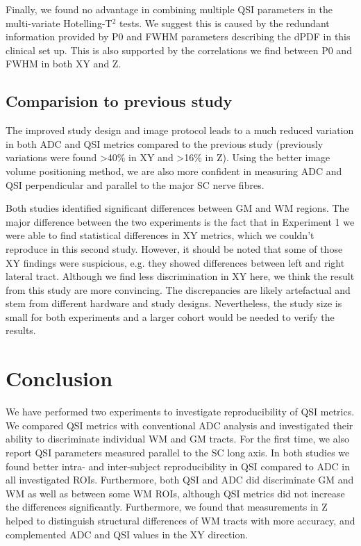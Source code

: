 Finally, we found no advantage in combining multiple QSI parameters in the multi-variate Hotelling-T$^2$ tests. We suggest this is caused by the redundant information provided by P0 and FWHM parameters describing the \gls{dPDF} in this clinical set up. This is also supported by the correlations we find between P0 and FWHM in both XY and Z.

\subsection{Comparision to previous study}
The improved study design and image protocol leads to a much reduced variation in both ADC and QSI metrics compared to the previous study (previously variations were found >40\% in XY and >16\% in Z). Using the better image volume positioning method, we are also more confident in measuring ADC and QSI perpendicular and parallel to the major \gls{SC} nerve fibres.

Both studies identified significant differences between GM and WM regions. The major difference between the two experiments is the fact that in Experiment 1 we were able to find statistical differences in XY metrics, which we couldn't reproduce in this second study. However, it should be noted that some of those XY findings were suspicious, e.g. they showed differences between left and right lateral tract. Although we find less discrimination in XY here, we think the result from this study are more convincing. The discrepancies are likely artefactual and stem from different hardware and study designs. Nevertheless, the study size is small for both experiments and a larger cohort would be needed to verify the results.
 
 

\section{Conclusion}
\label{par:chapter5 exp2 correlation}
We have performed two experiments to investigate reproducibility of QSI metrics. We compared QSI metrics with conventional ADC analysis and investigated their ability to discriminate individual WM and GM tracts. For the first time, we also report QSI parameters measured parallel to the \gls{SC} long axis. In both studies we found better intra- and inter-subject reproducibility in QSI compared to ADC in all investigated \glspl{ROI}. Furthermore, both QSI and ADC did discriminate GM and WM as well as between some WM \glspl{ROI}, although QSI metrics did not increase the differences significantly. Furthermore, we found that measurements in Z helped to distinguish structural differences of WM tracts with more accuracy, and complemented ADC and QSI values in the XY direction.


